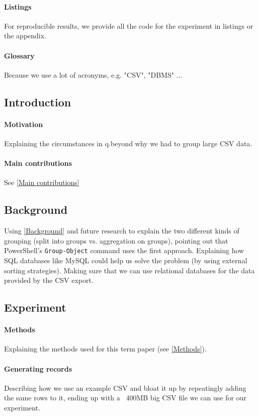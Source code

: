 \documentclass[12pt,letterpaper]{article} %
\begin{document}
\paragraph{Listings}
For reproducible results, we provide all the code for the experiment in listings
or the appendix.

\paragraph{Glossary}
Because we use a lot of acronyms, e.g. "CSV", "DBMS" ...

\subsection{Introduction}

\paragraph{Motivation}
Explaining the circumstances in q.beyond why we had to group large CSV data.
\paragraph{Main contributions}
See \ref{Main contributions}

\subsection{Background}
Using \ref{Background} and future research to explain the two different kinds of grouping
(split into groups vs. aggregation on groups), pointing out that PowerShell's \verb+Group-Object+
command uses the first approach. Explaining how SQL databases like MySQL could help us solve
the problem (by using external sorting strategies). Making sure that we can use
relational databases for the data provided by the CSV export.

\subsection{Experiment}

\paragraph{Methods}
Explaining the methods used for this term paper (see \ref{Methods}).

\paragraph{Generating records}
Describing how we use an example CSV and bloat it up by repeatingly adding the same
rows to it, ending up with a ~400MB big CSV file we can use for our experiment.
\end{document}
